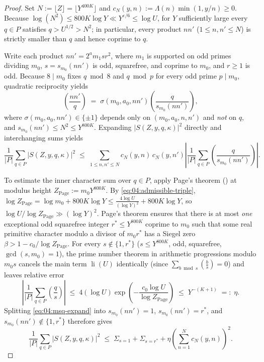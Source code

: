 \begin{proof}
Set $N := \lfloor Z \rfloor = \lfloor Y^{400K} \rfloor$ and $c_N(y, n) := \Lambda(n)\min(1, y/n) \ge 0$. Because $\log(N^2) \le 800 K \log Y \ll Y^{\varepsilon/6} \le \log U$, for $Y$ sufficiently large every $q \in P$ satisfies $q > U^{1/2} > N^2$; in particular, every product $n n'$ ($1 \le n, n' \le N$) is strictly smaller than $q$ and hence coprime to $q$.

Write each product $n n' = 2^a m_1 s r^2$, where $m_1$ is supported on odd primes dividing $m_0$, $s = s_{m_0}(n n')$ is odd, squarefree, and coprime to $m_0$, and $r \ge 1$ is odd. Because $8 \mid m_0$ fixes $q \bmod 8$ and $q \bmod p$ for every odd prime $p \mid m_0$, quadratic reciprocity yields
\[
  \left(\frac{n n'}{q}\right) \;=\; \sigma(m_0, a_0, n n') \left(\frac{q}{s_{m_0}(n n')}\right),
\]
where $\sigma(m_0, a_0, n n') \in \{\pm 1\}$ depends only on $(m_0, a_0, n, n')$ and \emph{not} on $q$, and $s_{m_0}(n n') \le N^2 \le Y^{800K}$. Expanding $|S(Z, y, q, \kappa)|^2$ directly and interchanging sums yields
\begin{equation}
\label{eq:04:msq-expand}
  \frac{1}{|P|}\sum_{q \in P} \bigl|S(Z, y, q, \kappa)\bigr|^2
  \;\le\; \sum_{1 \le n, n' \le N} c_N(y, n)\, c_N(y, n') \left|\frac{1}{|P|}\sum_{q \in P} \left(\frac{q}{s_{m_0}(n n')}\right)\right|.
\end{equation}

To estimate the inner character sum over $q \in P$, apply Page's theorem () at modulus height $Z_{\mathrm{Page}} := m_0 Y^{800K}$. By \eqref{eq:04:admissible-triple}, $\log Z_{\mathrm{Page}} = \log m_0 + 800 K \log Y \le \frac{4\log U}{(\log Y)^2} + 800 K \log Y$, so $\log U / \log Z_{\mathrm{Page}} \gg (\log Y)^2$. Page's theorem ensures that there is at most \emph{one} exceptional odd squarefree integer $r^* \le Y^{800K}$ coprime to $m_0$ such that some real primitive character modulo a divisor of $m_0 r^*$ has a Siegel zero $\beta > 1 - c_0/\log Z_{\mathrm{Page}}$. For every $s \notin \{1, r^*\}$ ($s \le Y^{800K}$, odd, squarefree, $\gcd(s, m_0) = 1$), the prime number theorem in arithmetic progressions modulo $m_0 s$ cancels the main term $\operatorname{li}(U)$ identically (since $\sum_{b \bmod s} (\frac{b}{s}) = 0$) and leaves relative error
\[
  \left|\frac{1}{|P|}\sum_{q \in P} \left(\frac{q}{s}\right)\right|
  \;\le\; 4(\log U)\exp\!\left(-\frac{c_0 \log U}{\log Z_{\mathrm{Page}}}\right)
  \;\le\; Y^{-(K+1)} \;=:\; \eta.
\]
Splitting \eqref{eq:04:msq-expand} into $s_{m_0}(nn') = 1$, $s_{m_0}(nn') = r^*$, and $s_{m_0}(nn') \notin \{1, r^*\}$ therefore gives
\begin{equation}
\label{eq:04:msq-three}
  \frac{1}{|P|}\sum_{q \in P} \bigl|S(Z, y, q, \kappa)\bigr|^2
  \;\le\; \Sigma_{s=1} + \Sigma_{s=r^*} + \eta\!\left(\sum_{n=1}^N c_N(y, n)\right)^2.
\end{equation}


\end{proof}
